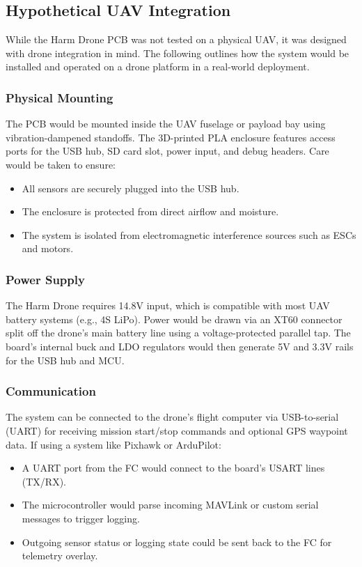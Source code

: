 \documentclass[../main.tex]{subfiles}
\begin{document}
\subsection{Hypothetical UAV Integration}

While the Harm Drone PCB was not tested on a physical UAV, it was designed with drone integration in mind. The following outlines how the system would be installed and operated on a drone platform in a real-world deployment.

\subsubsection{Physical Mounting}
The PCB would be mounted inside the UAV fuselage or payload bay using vibration-dampened standoffs. The 3D-printed PLA enclosure features access ports for the USB hub, SD card slot, power input, and debug headers. Care would be taken to ensure:

\begin{itemize}
    \item All sensors are securely plugged into the USB hub.
    \item The enclosure is protected from direct airflow and moisture.
    \item The system is isolated from electromagnetic interference sources such as ESCs and motors.
\end{itemize}

\subsubsection*{Power Supply}
The Harm Drone requires 14.8V input, which is compatible with most UAV battery systems (e.g., 4S LiPo). Power would be drawn via an XT60 connector split off the drone’s main battery line using a voltage-protected parallel tap. The board's internal buck and LDO regulators would then generate 5V and 3.3V rails for the USB hub and MCU.

\subsubsection{Communication}
The system can be connected to the drone’s flight computer via USB-to-serial (UART) for receiving mission start/stop commands and optional GPS waypoint data. If using a system like Pixhawk or ArduPilot:

\begin{itemize}
    \item A UART port from the FC would connect to the board’s USART lines (TX/RX).
    \item The microcontroller would parse incoming MAVLink or custom serial messages to trigger logging.
    \item Outgoing sensor status or logging state could be sent back to the FC for telemetry overlay.
\end{itemize}
\end{document}
